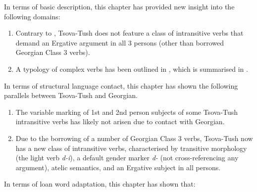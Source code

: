 In terms of basic description, this chapter has provided new insight into the following domains:

\begin{enumerate}
	\item Contrary to \textcite{holisky87}, Tsova-Tush does not feature a class of intransitive verbs that demand an Ergative argument in all 3 persons (other than borrowed Georgian Class 3 verbs).
	
	\item A typology of complex verbs has been outlined in , which is summarised in .
	
	
\end{enumerate}


In terms of structural language contact, this chapter has shown the following parallels between Tsova-Tush and Georgian.

\begin{enumerate}
	\item The variable marking of 1st and 2nd person subjects of some Tsova-Tush intransitive verbs has likely not arisen due to contact with Georgian.
	
	\item Due to the borrowing of a number of Georgian Class 3 verbs, Tsova-Tush now has a new class of intransitive verbs, characterised by transitive morphology (the light verb \textit{d-i}), a default gender marker \textit{d-} (not cross-referencing any argument), atelic semantics, and an Ergative subject in all persons.
	
\end{enumerate}


In terms of loan word adaptation, this chapter has shown that: 

